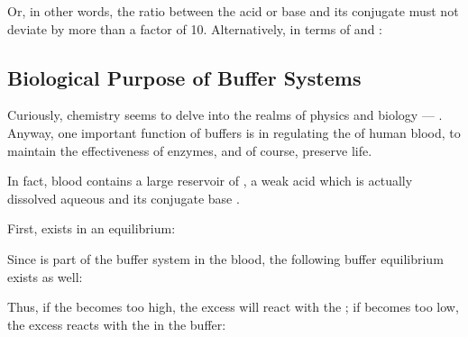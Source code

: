 			\pagebreak
			Or, in other words, the ratio between the acid or base and its conjugate must not deviate by more than a factor of \num{10}. Alternatively,
			in terms of \pH{} and \pOH{}:

			\mathdiagram{
				\[ \MpH\; range = \MpKa \pm 1 \hspace{12mm} \MpOH\; range = \MpKb \pm 1 \]
			}



		\subsection{Biological Purpose of Buffer Systems}

			Curiously, chemistry seems to delve into the realms of physics and biology --- . Anyway,
			one important function of buffers is in regulating the \pH{} of human blood, to maintain the effectiveness of enzymes, and of course,
			preserve life.

			In fact, blood contains a large reservoir of , a weak acid which is actually dissolved aqueous  and its
			conjugate base .

			First,  exists in an equilibrium:


			Since  is part of the buffer system in the blood, the following buffer equilibrium exists as well:



			Thus, if the \pH{} becomes too high, the excess  will react with the ; if \pH{} becomes too low, the
			excess  reacts with the  in the buffer:




